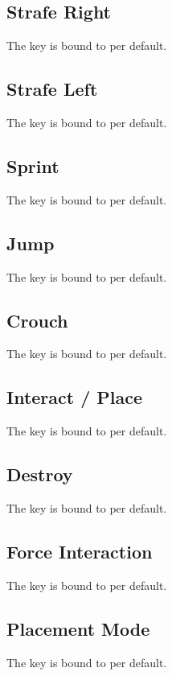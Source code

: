 \subsection{Strafe Right}\label{subsec:controls_strafe right}
The key is bound to
per default.

\subsection{Strafe Left}\label{subsec:controls_strafe left}
The key is bound to
per default.

\subsection{Sprint}\label{subsec:controls_sprint}
The key is bound to
per default.

\subsection{Jump}\label{subsec:controls_jump}
The key is bound to
per default.

\subsection{Crouch}\label{subsec:controls_crouch}
The key is bound to
per default.

\subsection{Interact / Place}\label{subsec:controls_interact / place}
The key is bound to
per default.

\subsection{Destroy}\label{subsec:controls_destroy}
The key is bound to
per default.

\subsection{Force Interaction}\label{subsec:controls_force interaction}
The key is bound to
per default.

\subsection{Placement Mode}\label{subsec:controls_placement mode}
The key is bound to
per default.

